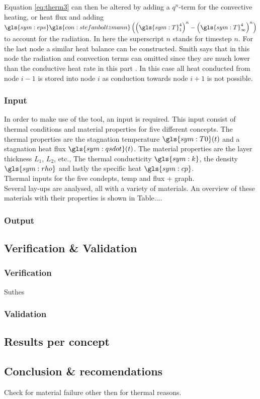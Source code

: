Equation \eqref{eq:therm3} can then be altered by adding a $q^n$-term for the convective heating, or heat flux and adding  $\gls{sym:eps}\gls{con:stefanboltzmann}\left(\left(\gls{sym:T}_1^4\right)^n-\left(\gls{sym:T}_\infty^4\right)^n\right)$ to account for the radiation. In here the superscript $n$ stands for timestep $n$. For the last node a similar heat balance can be constructed. Smith says that in this node the radiation and convection terms can omitted since they are much lower than the conductive heat rate in this part \cite{Smith2011}. In this case all heat conducted from node $i-1$ is stored into node $i$ as conduction towards node $i+1$ is not possible.


\subsubsection{Input}
In order to make use of the tool, an input is required. This input consist of thermal conditions and material properties for five different concepts. The thermal properties are the stagnation temperature $ \gls{sym:T0}(t) $ and a stagnation heat flux $ \gls{sym:qsdot}(t) $. The material properties are the layer thickness $ L_1 $, $ L_2 $, etc., The thermal conducticity $ \gls{sym:k} $, the density $ \gls{sym:rho} $ and lastly the specific heat $ \gls{sym:cp} $.\\

Thermal inputs for the five condepts, temp and flux + graph.\\

Several lay-ups are analysed, all with a variety of materials. An overview of these materials with their properties is shown in Table....


\subsubsection{Output}


\subsection{Verification \& Validation}

\subsubsection{Verification}
Suthes
\subsubsection{Validation}



\subsection{Results per concept}



\subsection{Conclusion \& recomendations}
Check for material failure other then for thermal reasons.
